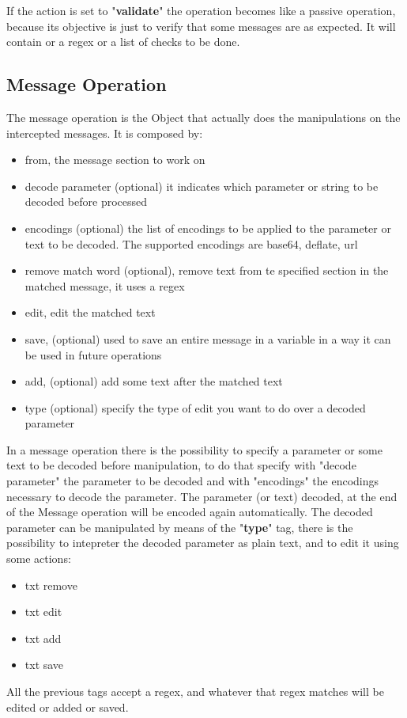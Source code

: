 If the action is set to "\textbf{validate}" the operation becomes like a passive operation, because its objective is just to verify that some messages are as expected. It will contain or a regex or a list of checks to be done.

\subsection{Message Operation}
The message operation is the Object that actually does the manipulations on the intercepted messages. It is composed by:
\begin{itemize}
    \item from, the message section to work on
    \item decode parameter (optional) it indicates which parameter or string to be decoded before processed
    \item encodings (optional) the list of encodings to be applied to the parameter or text to be decoded. The supported encodings are base64, deflate, url
    \item remove match word (optional), remove text from te specified section in the matched message, it uses a regex
    \item edit, edit the matched text
    \item save, (optional) used to save an entire message in a variable in a way it can be used in future operations
    \item add, (optional) add some text after the matched text
    \item type (optional) specify the type of edit you want to do over a decoded parameter
\end{itemize}

In a message operation there is the possibility to specify a parameter or some text to be decoded before manipulation, to do that specify with "decode parameter" the parameter to be decoded and with "encodings" the encodings necessary to decode the parameter. The parameter (or text) decoded, at the end of the Message operation will be encoded again automatically.
The decoded parameter can be manipulated by means of the "\textbf{type}" tag, there is the possibility to intepreter the decoded parameter as plain text, and to edit it using some actions:
\begin{itemize}
    \item txt remove
    \item txt edit
    \item txt add
    \item txt save
\end{itemize}
All the previous tags accept a regex, and whatever that regex matches will be edited or added or saved.

